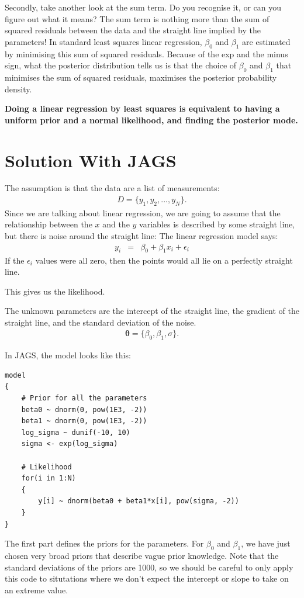 Secondly, take another look at the sum term. Do you recognise it, or can you
figure out what it means? The sum term is nothing more than the sum of squared
residuals between the data and the straight line implied by the parameters!
In standard least squares linear regression, $\beta_0$ and $\beta_1$ are
estimated by minimising this sum of squared residuals. Because of the exp and
the minus sign, what the posterior distribution tells us is that the choice of
$\beta_0$ and $\beta_1$ that minimises the sum of squared residuals, maximises
the posterior probability density.

\begin{framed}
\begin{center}
{\bf Doing a linear regression by least squares is equivalent to having a
uniform prior and a normal likelihood, and finding the posterior mode.}
\end{center}
\end{framed}


\section{Solution With JAGS}
The assumption is that the data are a list of measurements:
\begin{eqnarray}
D = \{y_1, y_2, ..., y_N\}.
\end{eqnarray}
Since we are talking about linear regression, we are going to assume that the
relationship between the $x$ and the $y$ variables is described by some
straight line, but there is noise around the straight line:
The linear regression model says:
\begin{eqnarray}
y_i &=& \beta_0 + \beta_1 x_i + \epsilon_i
\end{eqnarray}
If the $\epsilon_i$ values were all zero, then the points would all lie on
a perfectly straight line.

This gives us the likelihood.

The unknown parameters are the intercept of the straight line, the gradient of
the straight line, and the standard deviation of the noise.
\begin{eqnarray}
\boldsymbol{\theta} = \{\beta_0, \beta_1, \sigma\}.
\end{eqnarray}

In JAGS, the model looks like this:
\begin{framed}
\begin{verbatim}
model
{
    # Prior for all the parameters
    beta0 ~ dnorm(0, pow(1E3, -2))
    beta1 ~ dnorm(0, pow(1E3, -2))
    log_sigma ~ dunif(-10, 10)
    sigma <- exp(log_sigma)

    # Likelihood
    for(i in 1:N)
    {
        y[i] ~ dnorm(beta0 + beta1*x[i], pow(sigma, -2))
    }
}
\end{verbatim}
\end{framed}
The first part defines the priors for the parameters. For $\beta_0$ and $\beta_1$,
we have just chosen very broad priors that describe vague prior knowledge. Note
that the standard deviations of the priors are 1000, so we should be careful
to only apply this code to situtations where we don't expect the intercept or
slope to take on an extreme value.

